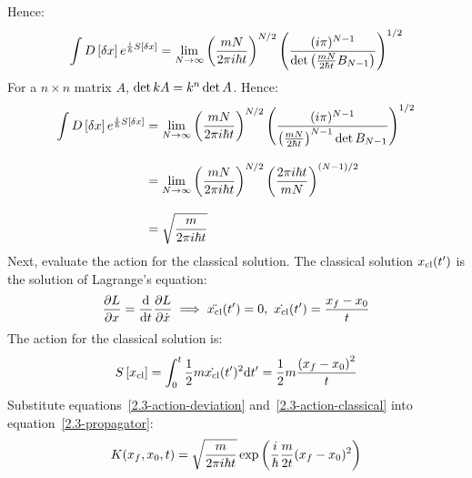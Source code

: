 Hence:
\begin{equation*}
  \int \func{D}{\xd} e^{\frac{i}{\hbar} \func{S}{\xd}}
  =
  \lim_{N \to \infty}
  \left(\frac{mN}{2\pi i\hbar t}\right)^{N/2}
  \left(\frac{(i\pi)^{N-1}}{\det\left(\frac{mN}{2\hbar t}\matr{B}_{N-1}\right)}\right)^{1/2}
\end{equation*}
For a $n\times n$ matrix $A$, $\det k\matr{A} = k^n \det\matr{A}$.
Hence:
\begin{align}
  \int \func{D}{\xd} e^{\frac{i}{\hbar} \func{S}{\xd}}
   & =
  \lim_{N \to \infty}
  \left(\frac{mN}{2\pi i\hbar t}\right)^{N/2}
  \left(\frac{(i\pi)^{N-1}}{\left(\frac{mN}{2\hbar t}\right)^{N-1}\det\matr{B}_{N-1}}\right)^{1/2}
  \nonumber
  \\[2ex]
   & =
  \lim_{N \to \infty}
  \left(\frac{mN}{2\pi i\hbar t}\right)^{N/2}
  \left(\frac{2\pi i\hbar t}{mN}\right)^{(N-1)/2}
  \nonumber
  \\[2ex]
  \label{2.3-action-deviation}
   & =
  \sqrt{\frac{m}{2\pi i\hbar t}}
\end{align}
Next, evaluate the action for the classical solution.
The classical solution $\xcl(\tp)$ is the solution of Lagrange's equation:
\begin{equation*}
  \del[L]{x} = \ddt\del[L]{\dot{x}}
  \implies
  \ddot{\xcl}(\tp) = 0,\
  \dot{\xcl}(\tp) = \frac{x_f - x_0}{t}
\end{equation*}
The action for the classical solution is:
\begin{equation}
  \label{2.3-action-classical}
  \func{S}{\xcl} = \int_{0}^{t} \half m \dot{\xcl}(\tp)^2 \dtp
  = \half m \frac{\left(x_f - x_0\right)^2}{t}
\end{equation}
Substitute equations~\ref{2.3-action-deviation} and~\ref{2.3-action-classical}
into equation~\ref{2.3-propagator}:
\begin{equation}
  \label{2.3-result}
  \propagator = \sqrt{\frac{m}{2\pi i\hbar t}}\exp\left(\ihbar\frac{m}{2t}(x_f - x_0)^2\right)
\end{equation}
